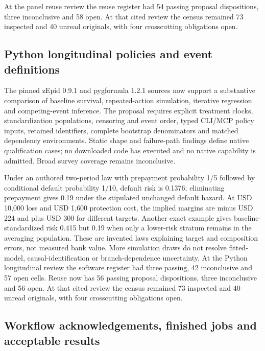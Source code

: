 At the panel reuse review the reuse register had 54 passing proposal
dispositions, three inconclusive and 58 open. At that cited review the
census remained 73 inspected and 40 unread originals, with four
crosscutting obligations open.
\citep{sp24panelreuse_reader,sp24panelreuse_progress}

\hypertarget{python-longitudinal-policies-and-event-definitions}{%
\subsection{Python longitudinal policies and event
definitions}\label{python-longitudinal-policies-and-event-definitions}}

The pinned zEpid 0.9.1 and pygformula 1.2.1 sources now support a
substantive comparison of baseline survival, repeated-action simulation,
iterative regression and competing-event inference. The proposal
requires explicit treatment clocks, standardization populations,
censoring and event order, typed CLI/MCP policy inputs, retained
identifiers, complete bootstrap denominators and matched dependency
environments. Static shape and failure-path findings define native
qualification cases; no downloaded code has executed and no native
capability is admitted. Broad survey coverage remains inconclusive.
\citep{exec24_longpy_zepid_source,exec24_longpy_pygformula_source}

Under an authored two-period law with prepayment probability 1/5
followed by conditional default probability 1/10, default risk is
0.1376; eliminating prepayment gives 0.19 under the stipulated unchanged
default hazard. At USD 10,000 loss and USD 1,600 protection cost, the
implied margins are minus USD 224 and plus USD 300 for different
targets. Another exact example gives baseline-standardized risk 0.415
but 0.19 when only a lower-risk stratum remains in the averaging
population. These are invented laws explaining target and composition
errors, not measured bank value. More simulation draws do not resolve
fitted-model, causal-identification or branch-dependence uncertainty.
\citep{exec24_longpy_reference} At the Python longitudinal review the
software register had three passing, 42 inconclusive and 57 open cells.
Reuse now has 56 passing proposal dispositions, three inconclusive and
56 open. At that cited review the census remained 73 inspected and 40
unread originals, with four crosscutting obligations open.
\citep{sp24longpy_reader,sp24longpy_progress}

\hypertarget{workflow-acknowledgements-finished-jobs-and-acceptable-results}{%
\subsection{Workflow acknowledgements, finished jobs and acceptable
results}\label{workflow-acknowledgements-finished-jobs-and-acceptable-results}}

